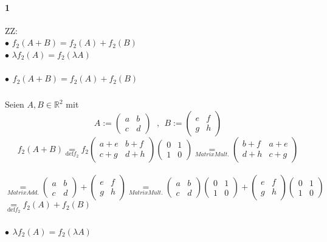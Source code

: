 \documentclass[10pt,a4paper]{article}
\begin{document}
\paragraph{1} ZZ:\\$ \bullet$ $f_{2}(A+B)=f_{2}(A)+f_{2}(B)$ \\$ \bullet$ $\lambda f_2(A)=f_2(\lambda A)$
\subparagraph{$ \bullet$ $f_{2}(A+B)=f_{2}(A)+f_{2}(B)$ }
Seien $ A,B \in \mathbb{R}^2$ mit 
$$A:= \begin{pmatrix}a & b\\c&d\end{pmatrix}\; \text{ , } \;B:= \begin{pmatrix}e&f\\g&h\end{pmatrix}$$
$$f_2(A+B)\underset{\text{def} f_2}{=} f_2\begin{pmatrix}a+e & b+f\\c+g&d+h\end{pmatrix} \begin{pmatrix} 0 & 1 \\1 &0\end{pmatrix} \underset{Matrix Mult.}{=} \begin{pmatrix}b+f&a+e\\d+h & c+g\end{pmatrix}$$\\ 
$$ \underset{Matrix Add.}{=} \begin{pmatrix}a & b\\c&d\end{pmatrix} +\begin{pmatrix}e&f\\g&h\end{pmatrix} 
\underset{Matrix Mult.}{=} \begin{pmatrix}a & b\\c&d\end{pmatrix} \begin{pmatrix} 0 & 1 \\1 &0\end{pmatrix} + \begin{pmatrix}e&f\\g&h\end{pmatrix} \begin{pmatrix} 0 & 1 \\1 &0\end{pmatrix}$$
$\underset{\text{def} f_2}{=} f_2(A)+f_2(B)$  \begin{flushright} \checkmark \end{flushright}
\subparagraph{$ \bullet$ $\lambda f_2(A)=f_2(\lambda A)$}
\end{document}
